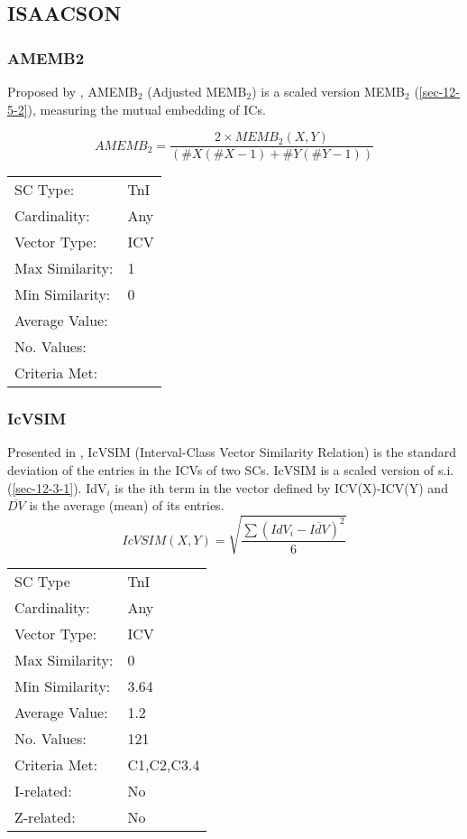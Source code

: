 \documentclass{article}
\begin{document}
\subsection{ISAACSON}
\label{sec-12-6}
\subsubsection{AMEMB2}
\label{sec-12-6-1}

Proposed by \citet[pp. 8]{Isaacson1990}, AMEMB$_{2}$ (Adjusted MEMB$_{2}$)
is a scaled version MEMB$_{2}$ (\ref{sec-12-5-2}), measuring the mutual
embedding of ICs.

$$AMEMB_{2}=\frac{2 \times
MEMB_{2}(X,Y)}{\left(\#X\left(\#X-1\right)+\#Y\left(\#Y-1\right)\right)}$$

\begin{center}
\begin{tabular}{ll}
 SC Type:         &  TnI  \\
 Cardinality:     &  Any  \\
 Vector Type:     &  ICV  \\
 Max Similarity:  &  1    \\
 Min Similarity:  &  0    \\
 Average Value:   &       \\
 No. Values:      &       \\
 Criteria Met:    &       \\
\end{tabular}
\end{center}
\subsubsection{IcVSIM}
\label{sec-12-6-2}

Presented in \citet[pp. 18]{Isaacson1990}, IcVSIM (Interval-Class
Vector Similarity Relation) is the standard deviation of the entries
in the ICVs of two SCs. IcVSIM is a scaled version of
s.i. (\ref{sec-12-3-1}). IdV$_{i}$ is the ith term in the vector defined by
ICV(X)-ICV(Y) and $\overline{DV}$ is the average (mean) of its
entries.
$$IcVSIM(X,Y)=\sqrt{\frac{\sum(IdV_{i}-\overline{IdV})^{2}}{6}}$$

\begin{center}
\begin{tabular}{ll}
 SC Type          &  TnI         \\
 Cardinality:     &  Any         \\
 Vector Type:     &  ICV         \\
 Max Similarity:  &  0           \\
 Min Similarity:  &  3.64        \\
 Average Value:   &  1.2         \\
 No. Values:      &  121         \\
 Criteria Met:    &  C1,C2,C3.4  \\
 I-related:       &  No          \\
 Z-related:       &  No          \\
\end{tabular}
\end{center}
\end{document}
